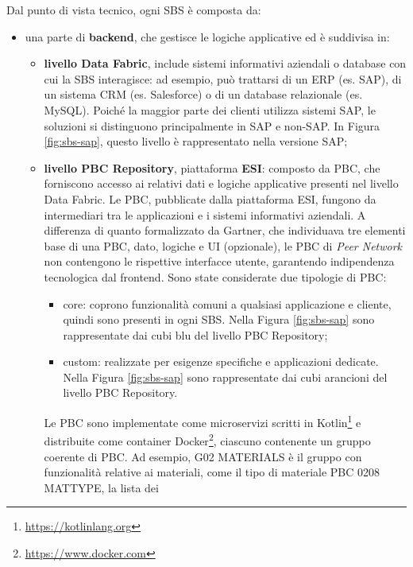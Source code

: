 Dal punto di vista tecnico, ogni \ac{SBS} è composta da:
\begin{itemize}
    \item una parte di \textbf{backend}, che gestisce le logiche applicative ed è suddivisa in:
        \begin{itemize}
            \item \textbf{livello Data Fabric}, include sistemi informativi aziendali o database con cui la
            \ac{SBS} interagisce: ad esempio, può trattarsi di un \ac{ERP} (es. SAP), di un sistema \ac{CRM}
            (es. Salesforce) o di un database relazionale (es. MySQL). Poiché la maggior parte
            dei clienti utilizza sistemi SAP, le soluzioni si distinguono principalmente in SAP e non-SAP. In Figura
            \ref{fig:sbs-sap}, questo livello è rappresentato nella versione SAP;
            \item \textbf{livello \ac{PBC} Repository}, piattaforma \textbf{\ac{ESI}}: composto da \ac{PBC}, che forniscono accesso
            ai relativi dati e logiche applicative presenti nel livello Data Fabric. Le \ac{PBC}, pubblicate
            dalla piattaforma \ac{ESI}, fungono da intermediari tra le applicazioni e i sistemi informativi aziendali.
            A differenza di quanto formalizzato da Gartner, che individuava tre
            elementi base di una \ac{PBC}, dato, logiche e UI (opzionale), le \ac{PBC} di \textit{Peer Network} non contengono
            le rispettive interfacce utente, garantendo indipendenza tecnologica dal frontend. Sono state
            considerate due tipologie di \ac{PBC}:
            \begin{itemize}
                \item core: coprono funzionalità comuni a qualsiasi applicazione e cliente, quindi
                sono presenti in ogni \ac{SBS}. Nella Figura \ref{fig:sbs-sap} sono rappresentate dai cubi blu
                del livello PBC Repository;
                \item custom: realizzate per esigenze specifiche e applicazioni dedicate. Nella Figura \ref{fig:sbs-sap} sono rappresentate dai cubi
                arancioni del livello PBC Repository.
            \end{itemize}
            Le \ac{PBC} sono implementate come microservizi scritti in Kotlin\footnote{\url{https://kotlinlang.org}} e distribuite come container
            Docker\footnote{\url{https://www.docker.com}}, ciascuno contenente un gruppo coerente di \ac{PBC}. Ad esempio, G02 MATERIALS è il gruppo con
            funzionalità relative ai materiali, come il tipo di materiale PBC 0208 MATTYPE, la lista dei

\end{itemize}
\end{itemize}
